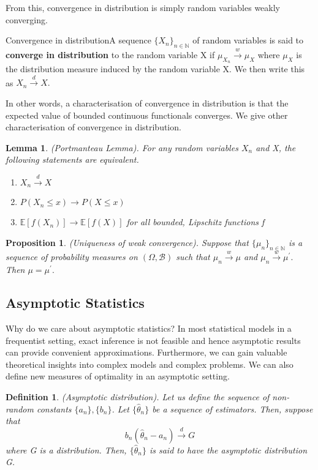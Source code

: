 \documentclass[twoside]{article}
\newtheorem{lemma}[theorem]{Lemma}
\newtheorem{proposition}[theorem]{Proposition}
\newtheorem{definition}[theorem]{Definition}
\newcommand{\borelsigmaalgebra}{\mathcal{B}}
\begin{document}
From this, convergence in distribution is simply random variables weakly converging.
\begin{definition_exam}{Convergence in distribution}{}A sequence $\{X_n\}_{n \in \mathbb{N}}$ of random variables is said to \textbf{converge in distribution} to the random variable X if $\mu_{X_{n}} \xrightarrow{w} \mu_{X}$ where $\mu_X$ is the distribution measure induced by the random variable X. We then write this as $X_n \xrightarrow{d} X.$ 
\end{definition_exam}

In other words, a characterisation of convergence in distribution is that the expected value of bounded continuous functionals converges. We give other characterisation of convergence in distribution.

\begin{lemma}(Portmanteau Lemma). For any random variables $X_n$ and X, the following statements are equivalent.
\begin{enumerate}
\item $X_n \xrightarrow{d} X$
\item $P(X_n \leq x) \rightarrow P(X \leq x)$
\item $\mathbb{E}[f(X_n)] \rightarrow \mathbb{E}[f(X)]$ for all bounded, Lipschitz functions f
\end{enumerate}
\end{lemma}

\begin{proposition}(Uniqueness of weak convergence). Suppose that $\{\mu_n\}_{n \in \mathbb{N}}$ is a sequence of probability measures on $(\Omega, \borelsigmaalgebra)$ such that $\mu_n \xrightarrow{w} \mu$ and $\mu_n \xrightarrow{w} \mu^{'}.$ Then $\mu = \mu^{'}.$
\end{proposition}

\subsection{Asymptotic Statistics}
Why do we care about asymptotic statistics? In most statistical models in a frequentist setting, exact inference is not feasible and hence asymptotic results can provide convenient approximations. Furthermore, we can gain valuable theoretical insights into complex models and complex problems. We can also define new measures of optimality in an asymptotic setting.

\begin{definition}(Asymptotic distribution). Let us define the sequence of non-random constants $\{a_n\}, \{b_n\}$. Let $\{\hat{\theta}_n\}$ be a sequence of estimators. Then, suppose that 
$$
b_n(\hat{\theta}_n - a_n) \xrightarrow{d} G
$$
where G is a distribution. Then, $\{\hat{\theta}_n\}$ is said to have the asymptotic distribution G.
\end{definition}
\end{document}
